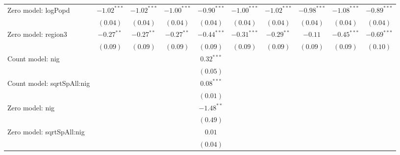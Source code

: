 \begin{center}
\begin{longtable}{l c c c c c c c c c}
Zero model: logPopd            & $-1.02^{***}$  & $-1.02^{***}$  & $-1.00^{***}$ & $-0.90^{***}$ & $-1.00^{***}$ & $-1.02^{***}$   & $-0.98^{***}$ & $-1.08^{***}$ & $-0.89^{***}$   \\
                               & $(0.04)$       & $(0.04)$       & $(0.04)$      & $(0.04)$      & $(0.04)$      & $(0.04)$        & $(0.04)$      & $(0.04)$      & $(0.04)$        \\
Zero model: region3            & $-0.27^{**}$   & $-0.27^{**}$   & $-0.27^{**}$  & $-0.44^{***}$ & $-0.31^{***}$ & $-0.29^{**}$    & $-0.11$       & $-0.45^{***}$ & $-0.69^{***}$   \\
                               & $(0.09)$       & $(0.09)$       & $(0.09)$      & $(0.09)$      & $(0.09)$      & $(0.09)$        & $(0.09)$      & $(0.09)$      & $(0.10)$        \\
Count model: nig               &                &                &               & $0.32^{***}$  &               &                 &               &               &                 \\
                               &                &                &               & $(0.05)$      &               &                 &               &               &                 \\
Count model: sqrtSpAll:nig     &                &                &               & $0.08^{***}$  &               &                 &               &               &                 \\
                               &                &                &               & $(0.01)$      &               &                 &               &               &                 \\
Zero model: nig                &                &                &               & $-1.48^{**}$  &               &                 &               &               &                 \\
                               &                &                &               & $(0.49)$      &               &                 &               &               &                 \\
Zero model: sqrtSpAll:nig      &                &                &               & $0.01$        &               &                 &               &               &                 \\
                               &                &                &               & $(0.04)$      &               &                 &               &               &                 \\

\end{longtable}
\end{center}
